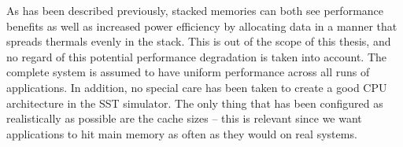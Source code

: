 As has been described previously, stacked memories can both see performance benefits as well as increased power efficiency by allocating data in a manner that spreads thermals evenly in the stack. This is out of the scope of this thesis, and no regard of this potential performance degradation is taken into account. The complete system is assumed to have uniform performance across all runs of applications. In addition, no special care has been taken to create a good CPU architecture in the SST simulator. The only thing that has been configured as realistically as possible are the cache sizes -- this is relevant since we want applications to hit main memory as often as they would on real systems.

